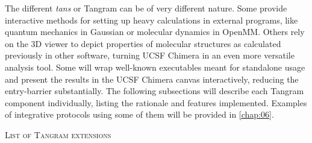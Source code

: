 The different \textit{tans} or Tangram can be of very different nature. Some provide interactive methods for setting up heavy calculations in external programs, like quantum mechanics in Gaussian or molecular dynamics in OpenMM. Others rely on the 3D viewer to depict properties of molecular structures as calculated previously in other software, turning UCSF Chimera in an even more versatile analysis tool. Some will wrap well-known executables meant for standalone usage and present the results in the UCSF Chimera canvas interactively, reducing the entry-barrier substantially. The following subsections will describe each Tangram component individually, listing the rationale and features implemented. Examples of integrative protocols using some of them will be provided in \autoref{chap:06}.

\textsc{List of Tangram extensions}

